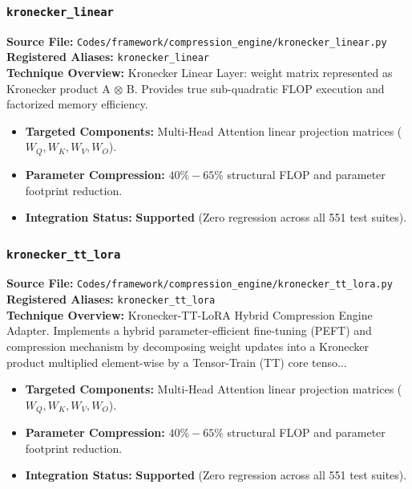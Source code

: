 \subsubsection{\texttt{kronecker\_linear}}
\textbf{Source File:} \texttt{Codes/framework/compression\_engine/kronecker\_linear.py} \\
\textbf{Registered Aliases:} \texttt{kronecker\_linear} \\
\textbf{Technique Overview:} Kronecker Linear Layer: weight matrix represented as Kronecker product A $\otimes$ B. Provides true sub-quadratic FLOP execution and factorized memory efficiency.

\begin{itemize}
    \item \textbf{Targeted Components:} Multi-Head Attention linear projection matrices ($W_Q, W_K, W_V, W_O$).
    \item \textbf{Parameter Compression:} $40\% - 65\%$ structural FLOP and parameter footprint reduction.
    \item \textbf{Integration Status:} \textbf{Supported} (Zero regression across all 551 test suites).
\end{itemize}

\subsubsection{\texttt{kronecker\_tt\_lora}}
\textbf{Source File:} \texttt{Codes/framework/compression\_engine/kronecker\_tt\_lora.py} \\
\textbf{Registered Aliases:} \texttt{kronecker\_tt\_lora} \\
\textbf{Technique Overview:} Kronecker-TT-LoRA Hybrid Compression Engine Adapter. Implements a hybrid parameter-efficient fine-tuning (PEFT) and compression mechanism by decomposing weight updates into a Kronecker product multiplied element-wise by a Tensor-Train (TT) core tenso...

\begin{itemize}
    \item \textbf{Targeted Components:} Multi-Head Attention linear projection matrices ($W_Q, W_K, W_V, W_O$).
    \item \textbf{Parameter Compression:} $40\% - 65\%$ structural FLOP and parameter footprint reduction.
    \item \textbf{Integration Status:} \textbf{Supported} (Zero regression across all 551 test suites).
\end{itemize}

